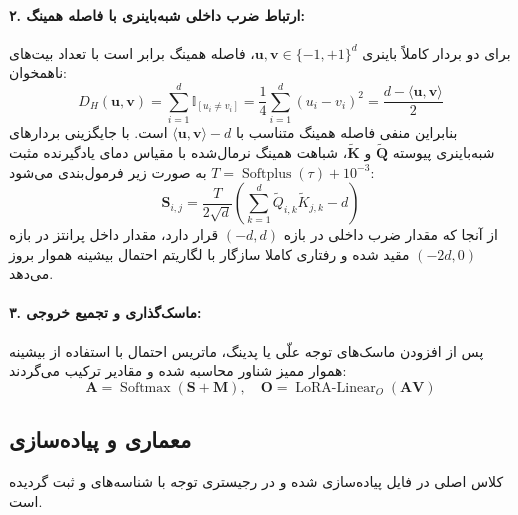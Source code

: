 \paragraph{۲. ارتباط ضرب داخلی شبه‌باینری با فاصله همینگ:}
برای دو بردار کاملاً باینری $\mathbf{u}, \mathbf{v} \in \{-1, +1\}^d$، فاصله همینگ برابر است با تعداد بیت‌های ناهمخوان:
\begin{equation}
D_H(\mathbf{u}, \mathbf{v}) = \sum_{i=1}^d \mathbb{I}_{[u_i \ne v_i]} = \frac{1}{4} \sum_{i=1}^d (u_i - v_i)^2 = \frac{d - \langle \mathbf{u}, \mathbf{v} \rangle}{2}
\end{equation}
بنابراین منفی فاصله همینگ متناسب با $\langle \mathbf{u}, \mathbf{v} \rangle - d$ است. با جایگزینی بردارهای شبه‌باینری پیوسته $\tilde{\mathbf{Q}}$ و $\tilde{\mathbf{K}}$، شباهت همینگ نرمال‌شده با مقیاس دمای یادگیرنده مثبت $T = \operatorname{Softplus}(\tau) + 10^{-3}$ به صورت زیر فرمول‌بندی می‌شود:
\begin{equation}
\mathbf{S}_{i, j} = \frac{T}{2 \sqrt{d}} \left( \sum_{k=1}^d \tilde{Q}_{i, k} \tilde{K}_{j, k} - d \right)
\end{equation}
از آنجا که مقدار ضرب داخلی در بازه $(-d, d)$ قرار دارد، مقدار داخل پرانتز در بازه $(-2d, 0)$ مقید شده و رفتاری کاملا سازگار با لگاریتم احتمال بیشینه هموار بروز می‌دهد.

\paragraph{۳. ماسک‌گذاری و تجمیع خروجی:}
پس از افزودن ماسک‌های توجه علّی یا پدینگ، ماتریس احتمال با استفاده از بیشینه هموار ممیز شناور محاسبه شده و مقادیر ترکیب می‌گردند:
\begin{equation}
\mathbf{A} = \operatorname{Softmax}\left(\mathbf{S} + \mathbf{M}\right), \quad \mathbf{O} = \operatorname{LoRA-Linear}_O(\mathbf{A} \mathbf{V})
\end{equation}

\subsection{معماری و پیاده‌سازی}
کلاس اصلی  در فایل  پیاده‌سازی شده و در رجیستری توجه با شناسه‌های  و  ثبت گردیده است.

